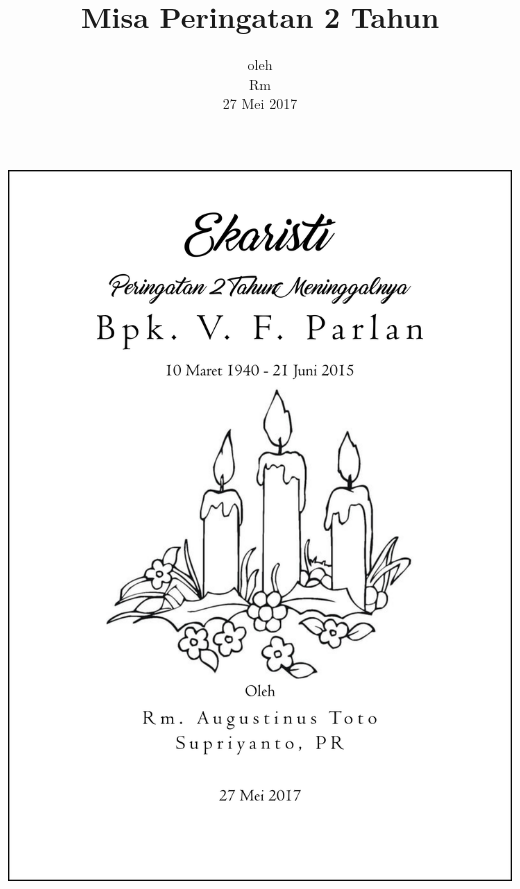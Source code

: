 \documentclass[titlepage,10pt,openany]{scrbook}
\title{Misa Peringatan 2 Tahun}
\author{\namaalm}
\date{oleh \\ Rm \namaromo\\27 Mei 2017}
\newcommand{\namaalm}{Bapak Vincentius Fererius Parlan }
\newcommand{\namaromo}{Rm. Augustinus Toto Supriyanto. Pr}
\begin{document}
\thispagestyle{empty}

%
\begin{center}
\includegraphics[scale=0.39005]{kover-ekaristi-2-tahun.png}
\end{center}

\end{document}
